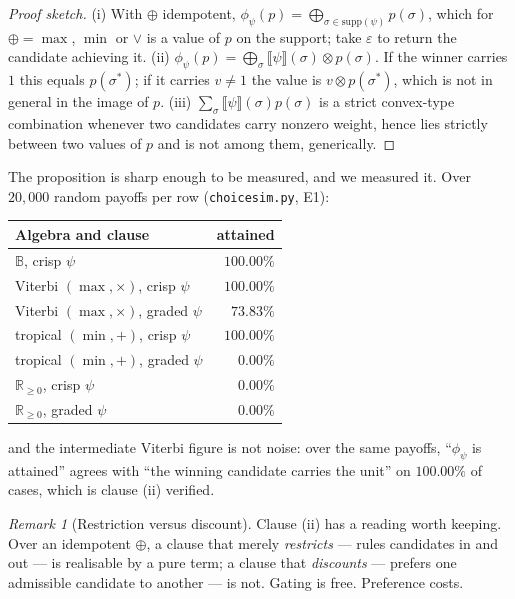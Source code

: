 \documentclass[11pt]{article}
\theoremstyle{definition}
\theoremstyle{plain}
\theoremstyle{remark}
\newtheorem{remark}{Remark}
\newcommand{\sumv}{\oplus}
\newcommand{\bigsumv}{\bigoplus}
\newcommand{\tensorv}{\otimes}
\newcommand{\Bool}{\mathbb{B}}
\newcommand{\Rnn}{\mathbb{R}_{\geq 0}}
\newcommand{\sem}[1]{\llbracket #1 \rrbracket}
\begin{document}
\begin{proof}[Proof sketch]
(i) With $\sumv$ idempotent, $\phi_\psi(p) = \bigsumv_{\sigma \in \mathrm{supp}(\psi)}
p(\sigma)$, which for $\sumv = \max$, $\min$ or $\vee$ is a value of $p$ on the
support; take $\varepsilon$ to return the candidate achieving it.
(ii) $\phi_\psi(p) = \bigsumv_\sigma \sem{\psi}(\sigma)\tensorv p(\sigma)$. If the
winner carries $1$ this equals $p(\sigma^\ast)$; if it carries $v \neq 1$ the value is
$v \tensorv p(\sigma^\ast)$, which is not in general in the image of $p$.
(iii) $\sum_\sigma \sem{\psi}(\sigma) p(\sigma)$ is a strict convex-type combination
whenever two candidates carry nonzero weight, hence lies strictly between two values of
$p$ and is not among them, generically.
\end{proof}

The proposition is sharp enough to be measured, and we measured it. Over $20{,}000$
random payoffs per row (\texttt{choicesim.py}, E1):

\begin{center}
\begin{tabular}{@{}lr@{}}
\toprule
\textbf{Algebra and clause} & \textbf{attained}\\
\midrule
$\Bool$, crisp $\psi$ & $100.00\%$\\
Viterbi $(\max,\times)$, crisp $\psi$ & $100.00\%$\\
Viterbi $(\max,\times)$, graded $\psi$ & $73.83\%$\\
tropical $(\min,+)$, crisp $\psi$ & $100.00\%$\\
tropical $(\min,+)$, graded $\psi$ & $0.00\%$\\
$\Rnn$, crisp $\psi$ & $0.00\%$\\
$\Rnn$, graded $\psi$ & $0.00\%$\\
\bottomrule
\end{tabular}
\end{center}

\noindent
and the intermediate Viterbi figure is not noise: over the same payoffs, ``$\phi_\psi$
is attained'' agrees with ``the winning candidate carries the unit'' on $100.00\%$ of
cases, which is clause (ii) verified.

\begin{remark}[Restriction versus discount]\label{rem:restrict}
Clause (ii) has a reading worth keeping. Over an idempotent $\sumv$, a clause that
merely \emph{restricts} --- rules candidates in and out --- is realisable by a pure
term; a clause that \emph{discounts} --- prefers one admissible candidate to another
--- is not. Gating is free. Preference costs.
\end{remark}
\end{document}
